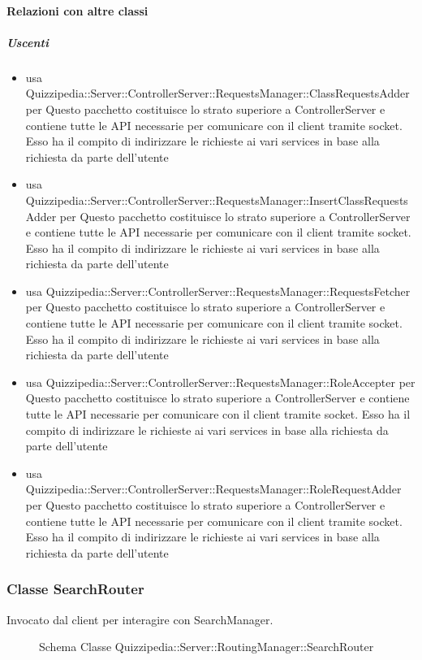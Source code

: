 \paragraph{Relazioni con altre classi}
\subparagraph{Uscenti}
\begin{itemize}
\item usa Quizzipedia::Server::ControllerServer::RequestsManager::ClassRequestsAdder per Questo pacchetto costituisce lo strato superiore a ControllerServer e contiene tutte le API necessarie per comunicare con il client tramite socket. Esso ha il compito di indirizzare le richieste ai vari services in base alla richiesta da parte dell'utente
\item usa Quizzipedia::Server::ControllerServer::RequestsManager::InsertClassRequestsAdder per Questo pacchetto costituisce lo strato superiore a ControllerServer e contiene tutte le API necessarie per comunicare con il client tramite socket. Esso ha il compito di indirizzare le richieste ai vari services in base alla richiesta da parte dell'utente
\item usa Quizzipedia::Server::ControllerServer::RequestsManager::RequestsFetcher per Questo pacchetto costituisce lo strato superiore a ControllerServer e contiene tutte le API necessarie per comunicare con il client tramite socket. Esso ha il compito di indirizzare le richieste ai vari services in base alla richiesta da parte dell'utente
\item usa Quizzipedia::Server::ControllerServer::RequestsManager::RoleAccepter per Questo pacchetto costituisce lo strato superiore a ControllerServer e contiene tutte le API necessarie per comunicare con il client tramite socket. Esso ha il compito di indirizzare le richieste ai vari services in base alla richiesta da parte dell'utente
\item usa Quizzipedia::Server::ControllerServer::RequestsManager::RoleRequestAdder per Questo pacchetto costituisce lo strato superiore a ControllerServer e contiene tutte le API necessarie per comunicare con il client tramite socket. Esso ha il compito di indirizzare le richieste ai vari services in base alla richiesta da parte dell'utente
\end{itemize}
\subsubsection{Classe SearchRouter}
Invocato dal client per interagire con SearchManager.
\begin{figure}[H]
\centering
\noindent{}
\caption[Schema Classe SearchRouter]{Schema Classe Quizzipedia::Server::RoutingManager::SearchRouter}
\end{figure}
